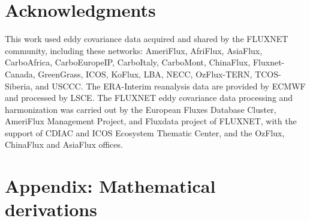 \documentclass[utf8]{frontiersSCNS} %
\begin{document}
\section*{Acknowledgments}
This work used eddy covariance data acquired and shared by the FLUXNET community, including these networks: AmeriFlux, AfriFlux, AsiaFlux, CarboAfrica, CarboEuropeIP, CarboItaly, CarboMont, ChinaFlux, Fluxnet-Canada, GreenGrass, ICOS, KoFlux, LBA, NECC, OzFlux-TERN, TCOS-Siberia, and USCCC. The ERA-Interim reanalysis data are provided by ECMWF and processed by LSCE. The FLUXNET eddy covariance data processing and harmonization was carried out by the European Fluxes Database Cluster, AmeriFlux Management Project, and Fluxdata project of FLUXNET, with the support of CDIAC and ICOS Ecosystem Thematic Center, and the OzFlux, ChinaFlux and AsiaFlux offices.


\section*{Appendix: Mathematical derivations}





\end{document}

